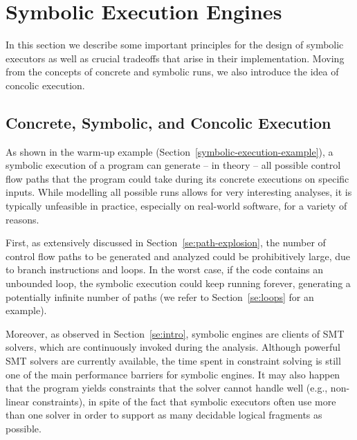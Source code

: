 
\section{Symbolic Execution Engines}
\label{se:executors}

In this section we describe some important principles for the design of symbolic executors as well as crucial tradeoffs that arise in their implementation. Moving from the concepts of concrete and symbolic runs, we also introduce the idea of concolic execution.

\subsection{Concrete, Symbolic, and Concolic Execution}
\label{ss:concrete-concolic-symbolic}

As shown in the warm-up example (Section~\ref{symbolic-execution-example}), a symbolic execution of a program can generate -- in theory -- all possible control flow paths that the program could take during its concrete executions on specific inputs. While modelling all possible runs allows for very interesting analyses, it is typically unfeasible in practice, especially on real-world software, for a variety of reasons.

First, as extensively discussed in Section~\ref{se:path-explosion}, the number of control flow paths to be generated and analyzed could be prohibitively large, due to branch instructions and loops. In the worst case, if the code contains an unbounded loop, the symbolic execution could keep running forever, generating a potentially infinite number of paths (we refer to Section~\ref{se:loops} for an example).

Moreover, as observed in Section~\ref{se:intro}, symbolic engines are clients of SMT solvers, which are continuously invoked during the analysis. Although powerful SMT solvers are currently available, the time spent in constraint solving is still one of the main performance barriers for symbolic engines. It may also happen that the program yields constraints that the solver cannot handle well (e.g., non-linear constraints), in spite of the fact that symbolic executors often use more than one solver in order to support as many decidable logical fragments as possible.
 
